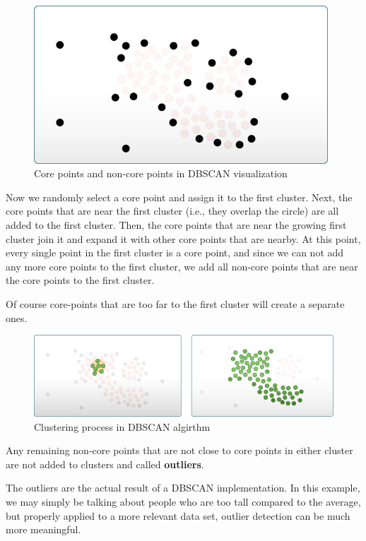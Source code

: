     \begin{figure}[H]
        \centering
        \includegraphics[width=11cm]{Images/1/dbscan-ex-3.png}
        \caption{Core points and non-core points in DBSCAN visualization}
    \end{figure}
    
    Now we randomly select a core point and assign it to the first cluster. Next, the core points that are near the first cluster (i.e., they overlap the circle) are all added to the first cluster. Then, the core points that are near the growing first cluster join it and expand it with other core points that are nearby.
    At this point, every single point in the first cluster is a core point, and since we can not add any more core points to the first cluster, we add all non-core points that are near the core points to the first cluster.
    
    Of course core-points that are too far to the first cluster will create a separate ones.
    
    \begin{figure}[H]
        \centering
        \includegraphics[width=16cm]{Images/1/dbscan-ex-4.png}
        \caption{Clustering process in DBSCAN algirthm}
    \end{figure}
    
    Any remaining non-core points that are not close to core points in either cluster are not added to clusters and called \textbf{outliers}.
    
    The outliers are the actual result of a DBSCAN implementation. In this example, we may simply be talking about people who are too tall compared to the average, but properly applied to a more relevant data set, outlier detection can be much more meaningful.